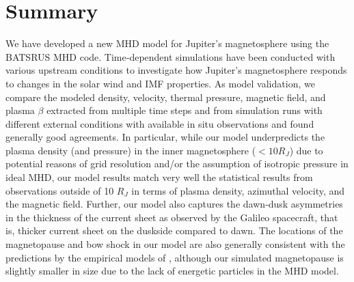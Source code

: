  

\section{Summary}

We have developed a new MHD model for Jupiter's magnetosphere using the BATSRUS MHD code. Time‐dependent simulations have been conducted with various upstream conditions to investigate how Jupiter's magnetosphere responds to changes in the solar wind and IMF properties. As model validation, we compare the modeled density, velocity, thermal pressure, magnetic field, and plasma $\beta$ extracted from multiple time steps and from simulation runs with different external conditions with available in situ observations and found generally good agreements. In particular, while our model underpredicts the plasma density (and pressure) in the inner magnetosphere ($<10 R_J$) due to potential reasons of grid resolution and/or the assumption of isotropic pressure in ideal MHD, our model results match very well the statistical results from observations outside of 10 $R_J$ in terms of plasma density, azimuthal velocity, and the magnetic field. Further, our model also captures the dawn‐dusk asymmetries in the thickness of the current sheet \cite{Khurana2005,Vogt2011a} as observed by the Galileo spacecraft, that is, thicker current sheet on the duskside compared to dawn. The locations of the magnetopause and bow shock in our model are also generally consistent with the predictions by the empirical models of \cite{Joy2002a}, although our simulated magnetopause is slightly smaller in size due to the lack of energetic particles in the MHD model. 


